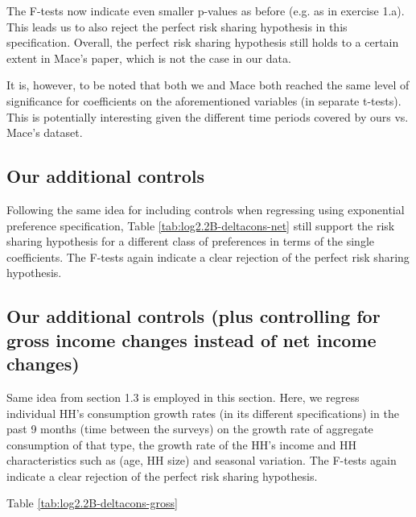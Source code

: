 \documentclass[12pt,a4paper]{article}
\begin{document}
The F-tests now indicate even smaller p-values as before (e.g. as in exercise 1.a). This leads us to also reject the perfect risk sharing hypothesis in this specification. Overall, the perfect risk sharing hypothesis still holds to a certain extent in Mace's paper, which is not the case in our data. 

It is, however, to be noted that both we and Mace both reached the same level of significance for coefficients on the aforementioned variables (in separate t-tests). This is potentially interesting given the different time periods covered by ours vs. Mace's dataset.


\subsection*{Our additional controls}

Following the same idea for including controls when regressing using exponential preference specification, Table \ref{tab:log2.2B-deltacons-net} still support the risk sharing hypothesis for a different class of preferences in terms of the single coefficients. The F-tests again indicate a clear rejection of the perfect risk sharing hypothesis.




\subsection*{Our additional controls (plus controlling for gross income changes instead of net income changes)}

Same idea from section 1.3 is employed in this section. Here, we regress individual HH's consumption growth rates (in its different specifications) in the past 9 months (time between the surveys) on the growth rate of aggregate consumption of that type, the growth rate of the HH's income and HH characteristics such as (age, HH size) and seasonal variation. The F-tests again indicate a clear rejection of the perfect risk sharing hypothesis.

\nocite{*}
Table \ref{tab:log2.2B-deltacons-gross}


\clearpage
{}


\end{document}
